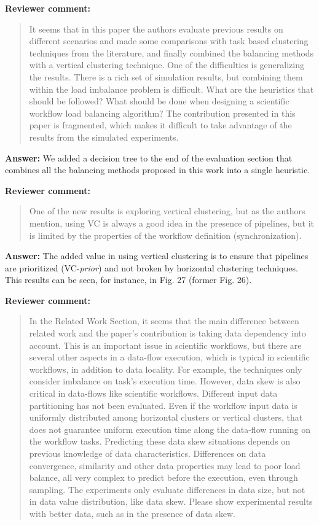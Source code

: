 \documentclass{letter}
\newenvironment{review}%
{\textbf{Reviewer comment:}\begin{quote}}%
{\end{quote}}%
\newcommand{\answer}[1]{%
      \textbf{Answer:} #1}
\begin{document}
\begin{letter}{}
\begin{review}
It seems that in this paper the authors evaluate previous results on different scenarios and made some comparisons with task based clustering techniques from the literature, and finally combined the balancing methods with a vertical clustering technique. One of the difficulties is generalizing the results. There is a rich set of simulation results, but combining them within the load imbalance problem is difficult. What are the heuristics that should be followed? What should be done when designing a scientific workflow load balancing algorithm? The contribution presented in this paper is fragmented, which makes it difficult to take advantage of the results from the simulated experiments. 
\end{review}

\answer{We added a decision tree to the end of the evaluation section that combines all the balancing methods proposed in this work into a single heuristic.}


\begin{review}
One of the new results is exploring vertical clustering, but as the authors mention, using VC is always a good idea in the presence of pipelines, but it is limited by the properties of the workflow definition (synchronization). 
\end{review}

\answer{The added value in using vertical clustering is to ensure that pipelines are prioritized (VC-\emph{prior}) and not broken by horizontal clustering techniques. This results can be seen, for instance, in Fig. 27 (former Fig. 26).}


\begin{review}
In the Related Work Section, it seems that the main difference between related work and the paper's contribution is taking data dependency into account. This is an important issue in scientific workflows, but there are several other aspects in a data-flow execution, which is typical in scientific workflows, in addition to data locality. For example, the techniques only consider imbalance on task's execution time. However, data skew is also critical in data-flows like scientific workflows. Different input data partitioning has not been evaluated. Even if the workflow input data is uniformly distributed among horizontal clusters or vertical clusters, that does not guarantee uniform execution time along the data-flow running on the workflow tasks. Predicting these data skew situations depends on previous knowledge of data characteristics. Differences on data convergence, similarity and other data properties may lead to poor load balance, all very complex to predict before the execution, even through sampling. The experiments only evaluate differences in data size, but not in data value distribution, like data skew. Please show experimental results with better data, such as in the presence of data skew.
\end{review}


\end{letter}
\end{document}

